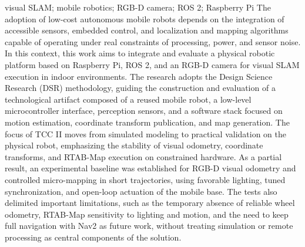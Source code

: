 \begin{englishabstract}{visual SLAM; mobile robotics; RGB-D camera; ROS 2; Raspberry Pi}
The adoption of low-cost autonomous mobile robots depends on the integration of accessible sensors, embedded control, and localization and mapping algorithms capable of operating under real constraints of processing, power, and sensor noise. In this context, this work aims to integrate and evaluate a physical robotic platform based on Raspberry Pi, ROS 2, and an RGB-D camera for visual SLAM execution in indoor environments. The research adopts the Design Science Research (DSR) methodology, guiding the construction and evaluation of a technological artifact composed of a reused mobile robot, a low-level microcontroller interface, perception sensors, and a software stack focused on motion estimation, coordinate transform publication, and map generation. The focus of TCC II moves from simulated modeling to practical validation on the physical robot, emphasizing the stability of visual odometry, coordinate transforms, and RTAB-Map execution on constrained hardware. As a partial result, an experimental baseline was established for RGB-D visual odometry and controlled micro-mapping in short trajectories, using favorable lighting, tuned synchronization, and open-loop actuation of the mobile base. The tests also delimited important limitations, such as the temporary absence of reliable wheel odometry, RTAB-Map sensitivity to lighting and motion, and the need to keep full navigation with Nav2 as future work, without treating simulation or remote processing as central components of the solution.
\end{englishabstract}
